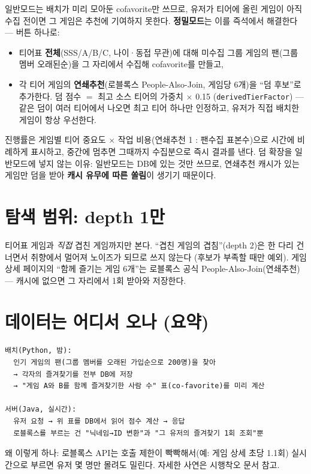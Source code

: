 \documentclass[11pt]{article}
\begin{document}
일반모드는 배치가 미리 모아둔 cofavorite만 쓰므로, 유저가 티어에 올린 게임이
아직 수집 전이면 그 게임은 추천에 기여하지 못한다. \textbf{정밀모드}는 이를
즉석에서 해결한다 --- 버튼 하나로:
\begin{itemize}
  \item 티어표 \textbf{전체}(SSS/A/B/C, 나이·동접 무관)에 대해 미수집 그룹
        게임의 팬(그룹 멤버 오래된순)을 그 자리에서 수집해 cofavorite를 만들고,
  \item 각 티어 게임의 \textbf{연쇄추천}(로블록스 People-Also-Join, 게임당 6개)을
        ``덤 후보''로 추가한다. 덤 점수 $=$ 최고 소스 티어의 가중치 $\times$ 0.15
        (\texttt{derivedTierFactor}) --- 같은 덤이 여러 티어에서 나오면 최고 티어
        하나만 인정하고, 유저가 직접 배치한 게임이 항상 우선한다.
\end{itemize}
진행률은 게임별 티어 중요도 $\times$ 작업 비용(연쇄추천 1 : 팬수집 표본수)으로
시간에 비례하게 표시하고, 중간에 멈추면 그때까지 수집분으로 즉시 결과를 낸다.
덤 확장을 일반모드에 넣지 않는 이유: 일반모드는 DB에 있는 것만 쓰므로, 연쇄추천
캐시가 있는 게임만 덤을 받아 \textbf{캐시 유무에 따른 쏠림}이 생기기 때문이다.

\section{탐색 범위: depth 1만}

티어표 게임과 \emph{직접} 겹친 게임까지만 본다. ``겹친 게임의 겹침''(depth 2)은
한 다리 건너면서 취향에서 멀어져 노이즈가 되므로 쓰지 않는다 (후보가 부족할 때만 예외).
게임 상세 페이지의 ``함께 즐기는 게임 6개''는 로블록스 공식
People-Also-Join(연쇄추천) --- 캐시에 없으면 그 자리에서 1회 받아와 저장한다.

\section{데이터는 어디서 오나 (요약)}

\begin{Verbatim}[frame=single, fontsize=\small]
배치(Python, 밤):
  인기 게임의 팬(그룹 멤버를 오래된 가입순으로 200명)을 찾아
  → 각자의 즐겨찾기를 전부 DB에 저장
  → "게임 A와 B를 함께 즐겨찾기한 사람 수" 표(co-favorite)를 미리 계산

서버(Java, 실시간):
  유저 요청 → 위 표를 DB에서 읽어 점수 계산 → 응답
  로블록스를 부르는 건 "닉네임→ID 변환"과 "그 유저의 즐겨찾기 1회 조회"뿐
\end{Verbatim}

왜 이렇게 하나: 로블록스 API는 호출 제한이 빡빡해서(예: 게임 상세 초당 1.1회)
실시간으로 부르면 유저 몇 명만 몰려도 밀린다. 자세한 사연은 시행착오 문서 참고.
\end{document}
